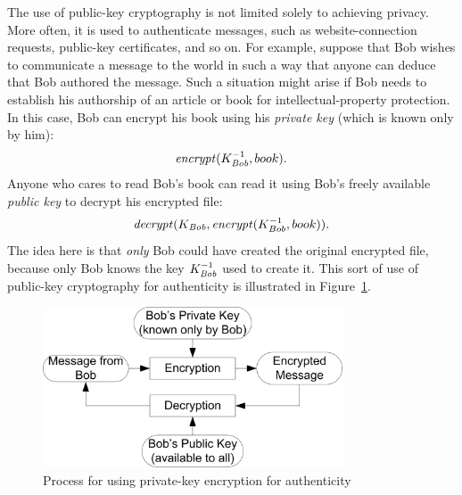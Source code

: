 The use of public-key cryptography is not limited solely to achieving
privacy. More often, it is used to authenticate messages, such as
website-connection requests, public-key certificates, and so on.  For
example, suppose that Bob wishes to communicate a message to the world
in such a way that anyone can deduce that Bob authored the message. Such
a situation might arise if Bob needs to establish his authorship of an
article or book for intellectual-property protection.  In this case, Bob
can encrypt his book using his \emph{private key} (which is known only
by him):
\[ \mathit{encrypt}(K^{-1}_{\textit{Bob}}, book). \]
Anyone who cares to read
Bob's book can read it using Bob's freely available \emph{public
  key} to decrypt his encrypted file:
\[ \mathit{decrypt}(K_{\textit{Bob}},\mathit{encrypt}(K^{-1}_{Bob},
book)). \] The idea here is that \emph{only} Bob could have created the
original encrypted file, because only Bob knows the key
$K^{-1}_{\textit{Bob}}$ used to create it.  This sort of use of public-key
  cryptography for authenticity is illustrated in
  Figure~\ref{fig:private key}.

\begin{figure}[tbp]
  \centering
  \includegraphics[width=3.5in]{Figures/pki/privateKey}
  \caption{Process for using private-key encryption for authenticity}
  \label{fig:private key}
\end{figure}

